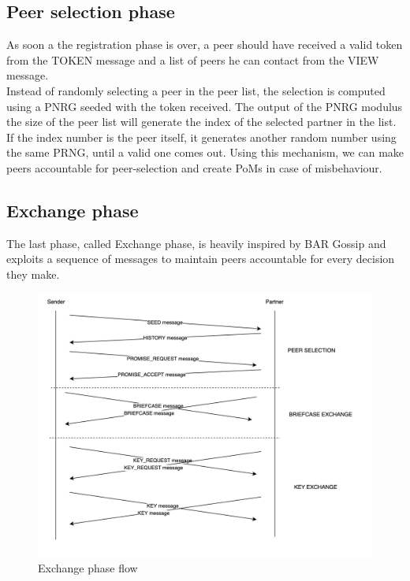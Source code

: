 \documentclass[mscthesis]{usiinfthesis}
\begin{document}
\subsection{Peer selection phase}
As soon a the registration phase is over, a peer should have received a valid token from the TOKEN message and a list of peers he can contact from the VIEW message. \\
Instead of randomly selecting a peer in the peer list, the selection is computed using a PNRG seeded with the token received. The output of the PNRG modulus the size of the peer list will generate the index of the selected partner in the list. \\ If the index number is the peer itself, it generates another random number using the same PRNG, until a valid one comes out.
Using this mechanism, we can make peers accountable for peer-selection and create PoMs in case of misbehaviour. 

\subsection{Exchange phase}
The last phase, called Exchange phase, is heavily inspired by BAR Gossip and exploits a sequence of messages to maintain peers accountable for every decision they make.

\begin{figure}[H]
\centering
  \includegraphics[width=12cm]{images/exchange-phase.png}
  \caption{Exchange phase flow}
  \label{fig:exchange-phase}
\end{figure}
\end{document}

